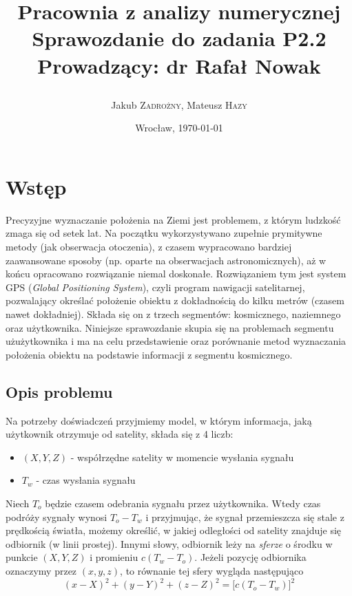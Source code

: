 \documentclass{article}
\title{\LARGE\textbf{Pracownia z analizy numerycznej} \\ Sprawozdanie do zadania \textbf{P2.2} \\
\vskip 0.2cm \large Prowadzący: dr Rafał Nowak\\
\author{ Jakub \textsc{Zadrożny}, Mateusz \textsc{Hazy}}}
\date{Wrocław, \today}
\begin{document}
\maketitle

\section{Wstęp}
Precyzyjne wyznaczanie położenia na Ziemi jest problemem, z którym ludzkość zmaga się od setek lat.
Na początku wykorzystywano zupełnie prymitywne metody (jak obserwacja otoczenia), z czasem wypracowano bardziej
zaawansowane sposoby (np. oparte na obserwacjach astronomicznych), aż w końcu opracowano rozwiązanie niemal doskonałe.
Rozwiązaniem tym jest system GPS (\textit{Global Positioning System}), czyli program nawigacji satelitarnej,
pozwalający określać położenie obiektu z dokładnością do kilku metrów (czasem nawet dokładniej).
Składa się on z trzech segmentów: kosmicznego, naziemnego oraz użytkownika. Niniejsze sprawozdanie skupia się na problemach
segmentu użużytkownika i ma na celu przedstawienie oraz porównanie metod wyznaczania położenia obiektu na podstawie
informacji z segmentu kosmicznego.

\subsection{Opis problemu}
Na potrzeby doświadczeń przyjmiemy model, w którym informacja, jaką użytkownik otrzymuje od satelity,
składa się z 4 liczb: \\
\begin{itemize}
    \item $(X, Y, Z)$ - współrzędne satelity w momencie wysłania sygnału\\
	\item $T_w$ - czas wysłania sygnału \\
\end{itemize}
Niech $T_{o}$ będzie czasem odebrania sygnału przez użytkownika. Wtedy czas podróży sygnały wynosi $T_o - T_w$ i
przyjmując, że sygnał przemieszcza się stale z prędkością światła, możemy określić, w jakiej odległości od satelity
znajduje się odbiornik (w linii prostej). Innymi słowy, odbiornik leży na \textit{sferze} o środku w punkcie $(X, Y, Z)$
i promieniu $c(T_w-T_o)$. Jeżeli pozycję odbiornika oznaczymy przez $(x, y, z)$, to równanie tej sfery wygląda następująco
\[
(x - X)^2 + (y - Y)^2 + (z - Z)^2 = \big[c(T_{o} - T_{w})\big]^2
\]
\end{document}
